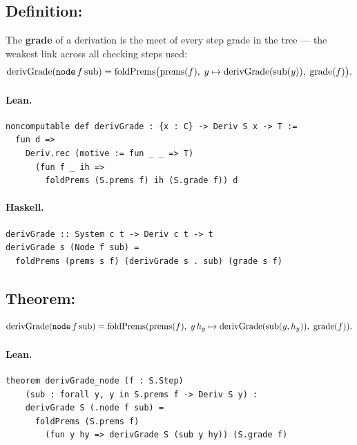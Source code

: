\documentclass[11pt,a4paper]{article}
\begin{document}
\subsection{Definition: }

\begin{defn}
The \textbf{grade} of a derivation is the meet of every step grade in the
tree --- the weakest link across all checking steps used:
\[
  \mathrm{derivGrade}(\texttt{node}\,f\,\mathrm{sub}) =
  \mathrm{foldPrems}\bigl(\mathrm{prems}(f),\;
  y \mapsto \mathrm{derivGrade}(\mathrm{sub}(y)),\;
  \mathrm{grade}(f)\bigr).
\]
\end{defn}

\paragraph{Lean.}
\begin{lstlisting}[style=lean]
noncomputable def derivGrade : {x : C} -> Deriv S x -> T :=
  fun d =>
    Deriv.rec (motive := fun _ _ => T)
      (fun f _ ih =>
        foldPrems (S.prems f) ih (S.grade f)) d
\end{lstlisting}

\paragraph{Haskell.}
\begin{lstlisting}[style=haskell]
derivGrade :: System c t -> Deriv c t -> t
derivGrade s (Node f sub) =
  foldPrems (prems s f) (derivGrade s . sub) (grade s f)
\end{lstlisting}


\subsection{Theorem: }

\begin{thm}
\[
  \mathrm{derivGrade}(\texttt{node}\,f\,\mathrm{sub}) =
  \mathrm{foldPrems}(\mathrm{prems}(f),\;
  y\,h_y \mapsto \mathrm{derivGrade}(\mathrm{sub}(y, h_y)),\;
  \mathrm{grade}(f)).
\]
\end{thm}

\paragraph{Lean.}
\begin{lstlisting}[style=lean]
theorem derivGrade_node (f : S.Step)
    (sub : forall y, y in S.prems f -> Deriv S y) :
    derivGrade S (.node f sub) =
      foldPrems (S.prems f)
        (fun y hy => derivGrade S (sub y hy)) (S.grade f)
\end{lstlisting}
\end{document}
